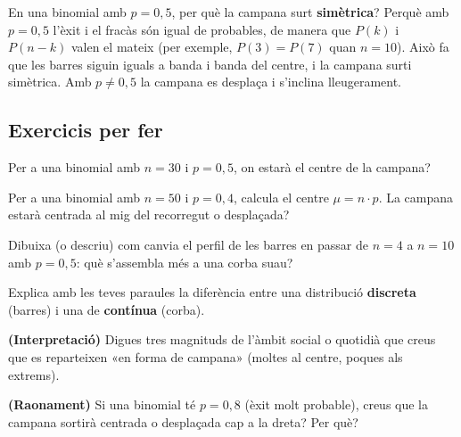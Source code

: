 \begin{exresolt}
En una binomial amb $p=0,5$, per què la campana surt \textbf{simètrica}?
\solucio
Perquè amb $p=0,5$ l'èxit i el fracàs són igual de probables, de manera que $P(k)$ i
$P(n-k)$ valen el mateix (per exemple, $P(3)=P(7)$ quan $n=10$). Això fa que les barres
siguin iguals a banda i banda del centre, i la campana surti simètrica. Amb $p\neq 0,5$
la campana es desplaça i s'inclina lleugerament.
\end{exresolt}

\subsection{Exercicis per fer}

\begin{exercicis}
\begin{exlist}
  \item Per a una binomial amb $n=30$ i $p=0,5$, on estarà el centre de la campana?
  \item Per a una binomial amb $n=50$ i $p=0,4$, calcula el centre $\mu=n\cdot p$. La
        campana estarà centrada al mig del recorregut o desplaçada?
  \item Dibuixa (o descriu) com canvia el perfil de les barres en passar de $n=4$ a
        $n=10$ amb $p=0,5$: què s'assembla més a una corba suau?
  \item Explica amb les teves paraules la diferència entre una distribució
        \textbf{discreta} (barres) i una de \textbf{contínua} (corba).
  \item \textbf{(Interpretació)} Digues tres magnituds de l'àmbit social o quotidià que
        creus que es reparteixen «en forma de campana» (moltes al centre, poques als
        extrems).
  \item \textbf{(Raonament)} Si una binomial té $p=0,8$ (èxit molt probable), creus que
        la campana sortirà centrada o desplaçada cap a la dreta? Per què?
\end{exlist}
\end{exercicis}

